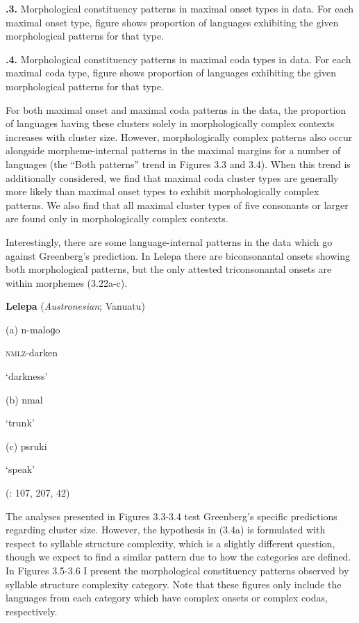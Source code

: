 \textbf{.3.} Morphological constituency patterns in maximal onset types in data. For each maximal onset type, figure shows proportion of languages exhibiting the given morphological patterns for that type.

\textbf{.4.} Morphological constituency patterns in maximal coda types in data. For each maximal coda type, figure shows proportion of languages exhibiting the given morphological patterns for that type.

  For both maximal onset and maximal coda patterns in the data, the proportion of languages having these clusters solely in morphologically complex contexts increases with cluster size. However, morphologically complex patterns also occur alongside morpheme-internal patterns in the maximal margins for a number of languages (the “Both patterns” trend in Figures 3.3 and 3.4). When this trend is additionally considered, we find that maximal coda cluster types are generally more likely than maximal onset types to exhibit morphologically complex patterns. We also find that all maximal cluster types of five consonants or larger are found only in morphologically complex contexts.

  Interestingly, there are some language-internal patterns in the data which go against Greenberg’s prediction. In Lelepa there are biconsonantal onsets showing both morphological patterns, but the only attested triconsonantal onsets are within morphemes (3.22a-c).

\ea\label{ex:(3.22)}
   \textbf{Lelepa} (\textit{Austronesian}; Vanuatu)

(a)  n{}-maloɡo

\textsc{nmlz}{}-darken

‘darkness’

(b)  nmal

‘trunk’

(c)  psruki

‘speak’

(\citealt{Lacrampe2014}: 107, 207, 42)

\z

  The analyses presented in Figures 3.3-3.4 test Greenberg’s specific predictions regarding cluster size. However, the hypothesis in (3.4a) is formulated with respect to syllable structure complexity, which is a slightly different question, though we expect to find a similar pattern due to how the categories are defined. In Figures 3.5-3.6 I present the morphological constituency patterns observed by syllable structure complexity category. Note that these figures only include the languages from each category which have complex onsets or complex codas, respectively.

